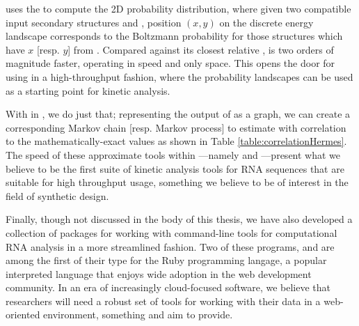  uses the \fft to compute the 2D probability distribution, where
given two compatible input secondary structures \strA and \strB, position
$(x,y)$ on the discrete energy landscape corresponds to the Boltzmann
probability for those structures \str which have \bpd $x$ [resp. $y$]
from . Compared against its closest relative \rnatwofold,
\ffttwo is two orders of magnitude faster, operating in  speed and only
 space. This opens the door for using \ffttwo in a high-throughput fashion,
where the probability landscapes can be used as a starting point for kinetic
analysis.

With \hermes in , we do just that; representing the output of
\ffttwo as a graph, we can create a corresponding Markov chain [resp. Markov
process] to estimate  with correlation to the
mathematically-exact values as shown in Table \ref{table:correlationHermes}.
The speed of these approximate tools within \hermes---namely \fftmfpt and
\ffteq---present what we believe to be the first suite of kinetic analysis
tools for RNA sequences that are suitable for high throughput usage, something
we believe to be of interest in the field of synthetic design.

Finally, though not discussed in the body of this thesis, we have also
developed a collection of packages for working with command-line tools for
computational RNA analysis in a more streamlined fashion. Two of these programs,
\href{https://github.com/evansenter/wrnap}{\wrnap} and
\href{https://github.com/evansenter/rbfam}{\rbfam} are among the first of their
type for the Ruby programming langage, a popular interpreted language that
enjoys wide adoption in the web development community. In an era of increasingly
cloud-focused software, we believe that researchers will need a robust set of
tools for working with their data in a web-oriented environment, something
\wrnap and \rbfam aim to provide.
